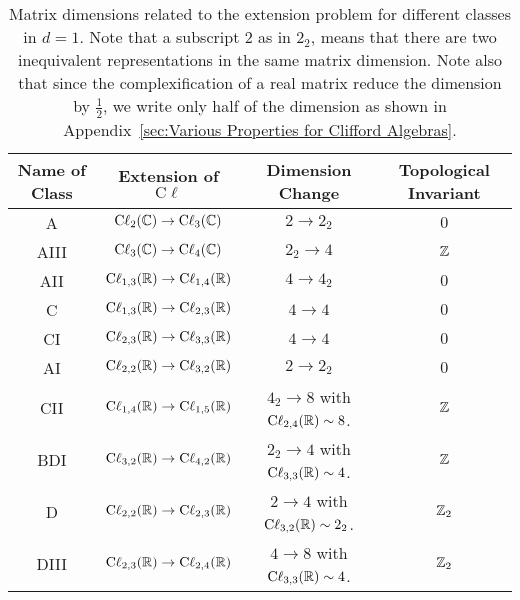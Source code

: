 \begin{table}[htpb]
    \centering
    \caption{Matrix dimensions related to the extension problem for different
        classes in $d=1$. Note that a subscript $2$ as in $2_2$, means that
        there are two inequivalent representations in the same matrix dimension.
        Note also that since the complexification of a real matrix reduce the
        dimension by $\frac{1}{2}$, we write only half of the dimension as shown
    in Appendix~\ref{sec:Various Properties for Clifford Algebras}. }
    \label{tab:mat-dim-allClass-1d}
    \begin{tabular}{c | c c c}
        Name of Class & Extension of $\mathrm{C\ell}$ & Dimension Change &
        Topological Invariant \\
        \hline
        A & $\mathrm{C\ell}_{2}(\mathbb{C})\to\mathrm{C\ell}_{3}(\mathbb{C})$ & $2\to2_2$ & $0$
        \\
        AIII & $\mathrm{C\ell}_{3}(\mathbb{C})\to\mathrm{C\ell}_{4}(\mathbb{C})$ & $2_2\to4$ &
        $\mathbb{Z}$
        \\
        AII & $\mathrm{C\ell}_{1,3}(\mathbb{R})\to\mathrm{C\ell}_{1,4}(\mathbb{R})$ & $4\to 4_2$ & $0$
        \\
        C & $\mathrm{C\ell}_{1,3}(\mathbb{R})\to\mathrm{C\ell}_{2,3}(\mathbb{R})$ & $4\to 4$ & $0$
        \\
        CI & $\mathrm{C\ell}_{2,3}(\mathbb{R})\to\mathrm{C\ell}_{3,3}(\mathbb{R})$ & $4\to 4$ & $0$
        \\
        AI & $\mathrm{C\ell}_{2,2}(\mathbb{R})\to\mathrm{C\ell}_{3,2}(\mathbb{R})$ & $2\to 2_2$ & $0$
        \\
        CII & $\mathrm{C\ell}_{1,4}(\mathbb{R})\to\mathrm{C\ell}_{1,5}(\mathbb{R})$ & $4_2\to 8$
        with $\mathrm{C\ell}_{2,4}(\mathbb{R})\sim 8$.
        & $\mathbb{Z}$
        \\
        BDI & $\mathrm{C\ell}_{3,2}(\mathbb{R})\to\mathrm{C\ell}_{4,2}(\mathbb{R})$ & $2_2\to 4$ 
        with $\mathrm{C\ell}_{3,3}(\mathbb{R})\sim 4$.
        & $\mathbb{Z}$
        \\
        D & $\mathrm{C\ell}_{2,2}(\mathbb{R})\to\mathrm{C\ell}_{2,3}(\mathbb{R})$ & $2\to 4$
        with $\mathrm{C\ell}_{3,2}(\mathbb{R})\sim2_2$.
        & $\mathbb{Z}_2$
        \\
        DIII & $\mathrm{C\ell}_{2,3}(\mathbb{R})\to\mathrm{C\ell}_{2,4}(\mathbb{R})$ & $4\to 8$ 
        with $\mathrm{C\ell}_{3,3}(\mathbb{R})\sim 4$.
        & $\mathbb{Z}_2$
        \\
        \hline
    \end{tabular}
\end{table}
